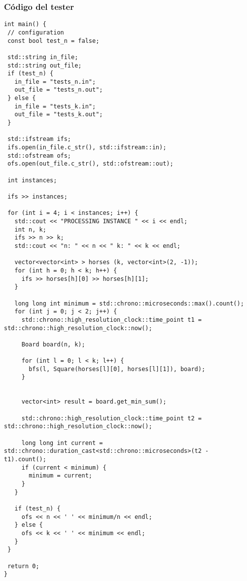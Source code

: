 \subsubsection{Código del tester}
\begin{lstlisting}[frame=single]
int main() {
 // configuration
 const bool test_n = false;

 std::string in_file;
 std::string out_file;
 if (test_n) {
   in_file = "tests_n.in";
   out_file = "tests_n.out";
 } else {
   in_file = "tests_k.in";
   out_file = "tests_k.out";
 }

 std::ifstream ifs;
 ifs.open(in_file.c_str(), std::ifstream::in);
 std::ofstream ofs;
 ofs.open(out_file.c_str(), std::ofstream::out);

 int instances;

 ifs >> instances;

 for (int i = 4; i < instances; i++) {
   std::cout << "PROCESSING INSTANCE " << i << endl;
   int n, k;
   ifs >> n >> k;
   std::cout << "n: " << n << " k: " << k << endl;

   vector<vector<int> > horses (k, vector<int>(2, -1));
   for (int h = 0; h < k; h++) {
     ifs >> horses[h][0] >> horses[h][1];
   }

   long long int minimum = std::chrono::microseconds::max().count();
   for (int j = 0; j < 2; j++) {
     std::chrono::high_resolution_clock::time_point t1 = std::chrono::high_resolution_clock::now();

     Board board(n, k);
     
     for (int l = 0; l < k; l++) {
       bfs(l, Square(horses[l][0], horses[l][1]), board);
     }
     

     vector<int> result = board.get_min_sum();

     std::chrono::high_resolution_clock::time_point t2 = std::chrono::high_resolution_clock::now();

     long long int current = std::chrono::duration_cast<std::chrono::microseconds>(t2 - t1).count();
     if (current < minimum) {
       minimum = current;
     }
   }

   if (test_n) {
     ofs << n << ' ' << minimum/n << endl;
   } else {
     ofs << k << ' ' << minimum << endl;
   }
 }

 return 0;
}
\end{lstlisting}

